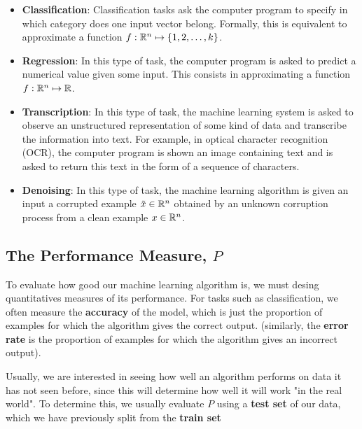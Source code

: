 \begin{itemize}
    \item \textbf{Classification}: Classification tasks ask the computer program to specify in which category does one input vector belong. Formally, this is equivalent to approximate a function \(f:\mathbb R^n \mapsto \{1, 2, \ldots, k\}\).
    \item \textbf{Regression}: In this type of task, the computer program is asked to predict a numerical value given some input. This consists in approximating a function \(f:\mathbb R^n \mapsto \mathbb R\).
    \item \textbf{Transcription}: In this type of task, the machine learning system is asked to observe an unstructured representation of some kind of data and transcribe the information into text. For example, in optical character recognition (OCR), the computer program is shown an image containing text and is asked to return this text in the form of a sequence of characters.
    \item \textbf{Denoising}: In this type of task, the machine learning algorithm is given an input a corrupted example \(\tilde{x} \in \mathbb R^n\) obtained by an unknown corruption process from a clean example \(x \in \mathbb R^n\).
\end{itemize}


\subsection{The Performance Measure, \(P\)}
To evaluate how good our machine learning algorithm is, we must desing quantitatives measures of its performance. For tasks such as classification, we often measure the \textbf{accuracy} of the model, which is just the proportion of examples for which the algorithm gives the correct output. (similarly, the \textbf{error rate} is the p{}roportion of examples for which the algorithm gives an incorrect output).

Usually, we are interested in seeing how well an algorithm performs on data it has not seen before, since this will determine how well it will work "in the real world". To determine this, we usually evaluate \(P\) using a \textbf{test set} of our data, which we have previously split from the \textbf{train set}


